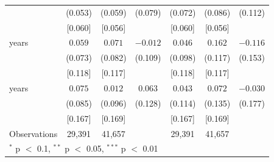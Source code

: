 \begin{tabular}{lcccccc}
 & (0.053) & (0.059) & (0.079) & (0.072) & (0.086) & (0.112) \\
 & [0.060] & [0.056] &  & [0.060] & [0.056] &  \\
\quad 2 years & $0.059$ & $0.071$ & $-0.012$ & $0.046$ & $0.162$ & $-0.116$ \\
 & (0.073) & (0.082) & (0.109) & (0.098) & (0.117) & (0.153) \\
 & [0.118] & [0.117] &  & [0.118] & [0.117] &  \\
\quad 3 years & $0.075$ & $0.012$ & $0.063$ & $0.043$ & $0.072$ & $-0.030$ \\
 & (0.085) & (0.096) & (0.128) & (0.114) & (0.135) & (0.177) \\
 & [0.167] & [0.169] &  & [0.167] & [0.169] &  \\
\midrule
Observations & 29,391 & 41,657 &  & 29,391 & 41,657 &  \\
\bottomrule
\multicolumn{7}{l}{\footnotesize $^{*}$ p $<$ 0.1, $^{**}$ p $<$ 0.05, $^{***}$ p $<$ 0.01} \\
\end{tabular}
